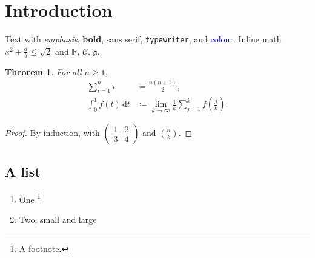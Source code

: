 \documentclass[11pt]{article}
\newtheorem{theorem}{Theorem}
\begin{document}
\section{Introduction}
Text with \emph{emphasis}, \textbf{bold}, \textsf{sans serif}, \texttt{typewriter},
and \textcolor{blue}{colour}. Inline math $x^2 + \frac{a}{b} \le \sqrt{2}$ and
$\mathbb{R}$, $\mathcal{C}$, $\mathfrak{g}$.
\begin{theorem}
For all $n \ge 1$,
\begin{align}
  \sum_{i=1}^{n} i &= \frac{n(n+1)}{2}, \\
  \int_0^1 f(t)\,\mathrm{d}t &\coloneqq \lim_{k\to\infty} \frac{1}{k} \sum_{j=1}^{k} f\!\left(\tfrac{j}{k}\right).
\end{align}
\end{theorem}
\begin{proof}
By induction, with $\begin{pmatrix} 1 & 2 \\ 3 & 4 \end{pmatrix}$ and $\binom{n}{k}$.
\end{proof}
\subsection{A list}
\begin{enumerate}
  \item One \footnote{A footnote.}
  \item Two, \small small \normalsize and \large large
\end{enumerate}
\end{document}
